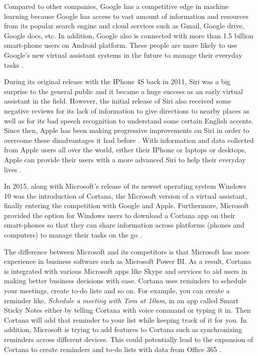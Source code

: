 Compared to other companies, Google has a competitive edge in machine learning because Google has access to vast amount of information and resources from its popular search engine and cloud services such as Gmail, Google drive, Google docs, etc. In addition, Google also is connected with more than 1.5 billion smart-phone users on Android platform. These people are more likely to use Google's new virtual assistant systems in the future to manage their everyday tasks \cite{Tal2015internet}.

During its original release with the IPhone 4S back in 2011, Siri was a big surprise to the general public and it became a huge success as an early virtual assistant in the field. However, the initial release of Siri also received some negative reviews for its lack of information to give directions to nearby places as well as for its bad speech recognition to understand some certain English accents. Since then, Apple has been making progressive improvements on Siri in order to overcome these disadvantages it had before \cite{Waters2015life}. With information and data collected from Apple users all over the world, either their IPhone or laptops or desktops, Apple can provide their users with a more advanced Siri to help their everyday lives \cite{Tal2015internet}.

In 2015, along with Microsoft's release of its newest operating system Windows 10 was the introduction of Cortana, the Microsoft version of a virtual assistant, finally entering the competition with Google and Apple. Furthermore, Microsoft provided the option for Windows users to download a Cortana app on their smart-phones so that they can share information across platforms (phones and computers) to manage their tasks on the go \cite{Tal2015internet}. 

The difference between Microsoft and its competitors is that Microsoft has more experience in business software such as Microsoft Power BI. As a result, Cortana is integrated with various Microsoft apps like Skype and services to aid users in making better business decisions with ease. Cortana uses reminders to schedule your meetings, create to-do lists and so on. For example, you can create a reminder like, {\em Schedule a meeting with Tom at 10am}, in an app called Smart Sticky Notes either by telling Cortana with voice command or typing it in. Then Cortana will add that reminder to your list while keeping track of it for you. In addition, Microsoft is trying to add features to Cortana such as synchronizing reminders across different devices. This could potentially lead to the expansion of Cortana to create reminders and to-do lists with data from Office 365 \cite{Marvin2017them}.

